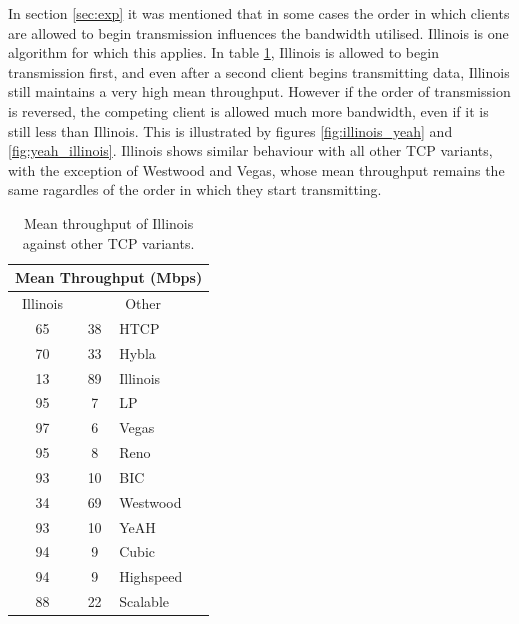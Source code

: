 \documentclass[11pt,a4paper,twocolumn]{article}
\begin{document}
In section \ref{sec:exp} it was mentioned that in some cases the order in which clients are allowed to begin transmission influences the bandwidth utilised. Illinois is one algorithm for which this applies. In table
\ref{table:illinois}, Illinois is allowed to begin transmission first, and even after a second client begins
transmitting data, Illinois still maintains a very high mean throughput. However if the order of transmission
is reversed, the competing client is allowed much more bandwidth, even if it is still less than Illinois.
This is illustrated by figures \ref{fig:illinois_yeah} and \ref{fig:yeah_illinois}. Illinois shows similar
behaviour with all other TCP variants, with the exception of Westwood and Vegas, whose mean
throughput remains the same ragardles of the order in which they start transmitting.

\begin{table}[h!]
	\begin{center}
		\begin{tabular}{| c | c | l |}
    			\hline
			\multicolumn{3}{|c|}{Mean Throughput (Mbps)} \\
    			\hline
    			Illinois &  \multicolumn{2}{|c|}{Other}  \\
			\hline
    			65 & 38 & HTCP \\
			\hline
    			70 & 33 & Hybla \\
			\hline
    			13 & 89 & Illinois \\
			\hline
    			95 & 7 & LP \\
			\hline
    			97 & 6 & Vegas \\
			\hline
    			95 & 8 & Reno \\
			\hline
    			93 & 10 & BIC \\
			\hline
    			34 & 69 & Westwood \\
			\hline
    			93 & 10 & YeAH \\
			\hline
    			94 & 9 & Cubic \\
			\hline
    			94 & 9 & Highspeed \\
			\hline
    			88 & 22 & Scalable \\
    			\hline
    		\end{tabular}
  	\end{center}
  	\caption{Mean throughput of Illinois against other TCP variants.}
	\label{table:illinois}
\end{table}
\end{document}
